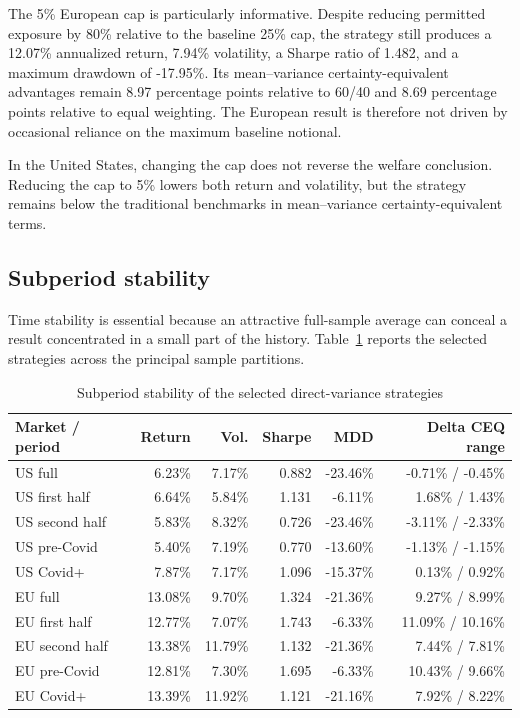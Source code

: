 The 5\% European cap is particularly informative. Despite reducing permitted exposure by 80\% relative to the baseline 25\% cap, the strategy still produces a 12.07\% annualized return, 7.94\% volatility, a Sharpe ratio of 1.482, and a maximum drawdown of -17.95\%. Its mean--variance certainty-equivalent advantages remain 8.97 percentage points relative to 60/40 and 8.69 percentage points relative to equal weighting. The European result is therefore not driven by occasional reliance on the maximum baseline notional.

In the United States, changing the cap does not reverse the welfare conclusion. Reducing the cap to 5\% lowers both return and volatility, but the strategy remains below the traditional benchmarks in mean--variance certainty-equivalent terms.

\subsection{Subperiod stability}

Time stability is essential because an attractive full-sample average can conceal a result concentrated in a small part of the history. Table~\ref{tab:subperiod_robustness} reports the selected strategies across the principal sample partitions.

\begin{table}[htbp]
\centering
\scriptsize
\caption{Subperiod stability of the selected direct-variance strategies}
\label{tab:subperiod_robustness}
\begin{tabularx}{\textwidth}{Xrrrrr}
\toprule
Market / period
& Return
& Vol.
& Sharpe
& MDD
& Delta CEQ range \\
\midrule
US full
& 6.23\%
& 7.17\%
& 0.882
& -23.46\%
& -0.71\% / -0.45\% \\
US first half
& 6.64\%
& 5.84\%
& 1.131
& -6.11\%
& 1.68\% / 1.43\% \\
US second half
& 5.83\%
& 8.32\%
& 0.726
& -23.46\%
& -3.11\% / -2.33\% \\
US pre-Covid
& 5.40\%
& 7.19\%
& 0.770
& -13.60\%
& -1.13\% / -1.15\% \\
US Covid+
& 7.87\%
& 7.17\%
& 1.096
& -15.37\%
& 0.13\% / 0.92\% \\
EU full
& 13.08\%
& 9.70\%
& 1.324
& -21.36\%
& 9.27\% / 8.99\% \\
EU first half
& 12.77\%
& 7.07\%
& 1.743
& -6.33\%
& 11.09\% / 10.16\% \\
EU second half
& 13.38\%
& 11.79\%
& 1.132
& -21.36\%
& 7.44\% / 7.81\% \\
EU pre-Covid
& 12.81\%
& 7.30\%
& 1.695
& -6.33\%
& 10.43\% / 9.66\% \\
EU Covid+
& 13.39\%
& 11.92\%
& 1.121
& -21.16\%
& 7.92\% / 8.22\% \\
\bottomrule
\end{tabularx}
\end{table}

